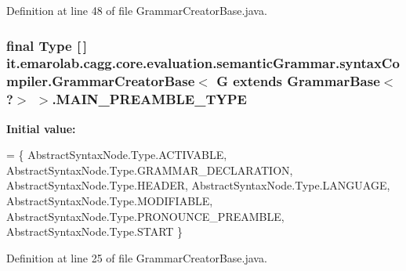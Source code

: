 Definition at line 48 of file Grammar\-Creator\-Base.\-java.

\hypertarget{classit_1_1emarolab_1_1cagg_1_1core_1_1evaluation_1_1semanticGrammar_1_1syntaxCompiler_1_1Gramma1bf252c3f4def91ad707660fdfe73d0a_ad3985dab20f7e9acd39c292126b13a9a}{
\subsubsection[{M\-A\-I\-N\-\_\-\-P\-R\-E\-A\-M\-B\-L\-E\-\_\-\-T\-Y\-P\-E}]{\setlength{\rightskip}{0pt plus 5cm}final Type \mbox{[}$\,$\mbox{]} it.\-emarolab.\-cagg.\-core.\-evaluation.\-semantic\-Grammar.\-syntax\-Compiler.\-Grammar\-Creator\-Base$<$ G extends Grammar\-Base$<$ ?$>$ $>$.M\-A\-I\-N\-\_\-\-P\-R\-E\-A\-M\-B\-L\-E\-\_\-\-T\-Y\-P\-E\hspace{0.3cm}{\ttfamily [static]}}}\label{classit_1_1emarolab_1_1cagg_1_1core_1_1evaluation_1_1semanticGrammar_1_1syntaxCompiler_1_1Gramma1bf252c3f4def91ad707660fdfe73d0a_ad3985dab20f7e9acd39c292126b13a9a}
{\bfseries Initial value\-:}
\begin{DoxyCode}
= \{ 
        AbstractSyntaxNode.Type.ACTIVABLE, 
        AbstractSyntaxNode.Type.GRAMMAR\_DECLARATION, 
        AbstractSyntaxNode.Type.HEADER,
        AbstractSyntaxNode.Type.LANGUAGE, 
        AbstractSyntaxNode.Type.MODIFIABLE, 
        AbstractSyntaxNode.Type.PRONOUNCE\_PREAMBLE,
        AbstractSyntaxNode.Type.START
    \}
\end{DoxyCode}


Definition at line 25 of file Grammar\-Creator\-Base.\-java.

